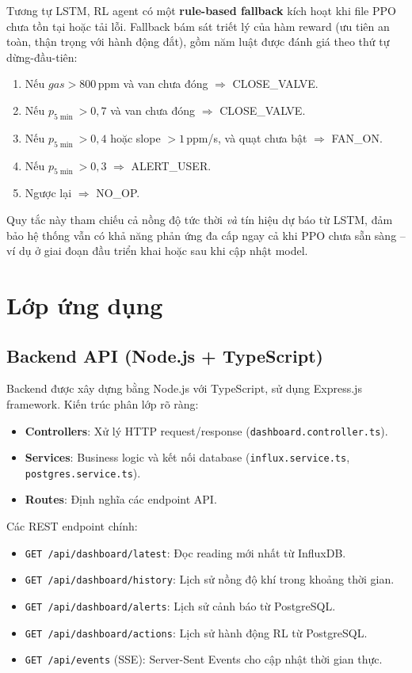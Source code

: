 Tương tự LSTM, RL agent có một \textbf{rule-based fallback} kích hoạt khi file PPO chưa tồn tại hoặc tải lỗi. Fallback bám sát triết lý của hàm reward (ưu tiên an toàn, thận trọng với hành động đắt), gồm năm luật được đánh giá theo thứ tự dừng-đầu-tiên:
\begin{enumerate}
  \item Nếu $gas > 800$\,ppm và van chưa đóng $\Rightarrow$ CLOSE\_VALVE.
  \item Nếu $p_{5\min} > 0{,}7$ và van chưa đóng $\Rightarrow$ CLOSE\_VALVE.
  \item Nếu $p_{5\min} > 0{,}4$ hoặc slope $> 1$\,ppm/s, và quạt chưa bật $\Rightarrow$ FAN\_ON.
  \item Nếu $p_{5\min} > 0{,}3$ $\Rightarrow$ ALERT\_USER.
  \item Ngược lại $\Rightarrow$ NO\_OP.
\end{enumerate}
Quy tắc này tham chiếu cả nồng độ tức thời \emph{và} tín hiệu dự báo từ LSTM, đảm bảo hệ thống vẫn có khả năng phản ứng đa cấp ngay cả khi PPO chưa sẵn sàng -- ví dụ ở giai đoạn đầu triển khai hoặc sau khi cập nhật model.

\section{Lớp ứng dụng}

\subsection{Backend API (Node.js + TypeScript)}

Backend được xây dựng bằng Node.js với TypeScript, sử dụng Express.js framework. Kiến trúc phân lớp rõ ràng:

\begin{itemize}
  \item \textbf{Controllers}: Xử lý HTTP request/response (\texttt{dashboard.controller.ts}).
  \item \textbf{Services}: Business logic và kết nối database (\texttt{influx.service.ts}, \texttt{postgres.service.ts}).
  \item \textbf{Routes}: Định nghĩa các endpoint API.
\end{itemize}

Các REST endpoint chính:
\begin{itemize}
  \item \texttt{GET /api/dashboard/latest}: Đọc reading mới nhất từ InfluxDB.
  \item \texttt{GET /api/dashboard/history}: Lịch sử nồng độ khí trong khoảng thời gian.
  \item \texttt{GET /api/dashboard/alerts}: Lịch sử cảnh báo từ PostgreSQL.
  \item \texttt{GET /api/dashboard/actions}: Lịch sử hành động RL từ PostgreSQL.
  \item \texttt{GET /api/events} (SSE): Server-Sent Events cho cập nhật thời gian thực.
\end{itemize}

